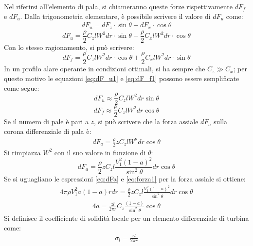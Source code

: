 Nel riferirsi all'elemento di pala, si chiameranno queste forze rispettivamente $dF_f$ e $dF_u$. Dalla trigonometria elementare, è possibile scrivere il valore di $dF_u$ come:
\begin{align*}
dF_u = dF_z \cdot \sin \theta - dF_x \cdot \cos \theta
\end{align*}
\begin{equation}\label{eq:dF_u1}
dF_u = \frac{\rho}{2} C_z l W^2 dr \cdot \sin \theta - \frac{\rho}{2} C_x l W^2 dr \cdot \cos \theta
\end{equation}
Con lo stesso ragionamento, si può scrivere:
\begin{equation}\label{eq:dF_f1}
dF_f = \frac{\rho}{2} C_z l W^2 dr \cdot \cos \theta + \frac{\rho}{2} C_x l W^2 dr \cdot \sin \theta
\end{equation}
In un profilo alare operante in condizioni ottimali, si ha sempre che $C_z \gg C_x$; per questo motivo le equazioni \ref{eq:dF_u1} e \ref{eq:dF_f1} possono essere semplificate come segue:
\begin{equation}\label{eq:dF_u2}
dF_u \approx \frac{\rho}{2} C_zl W^2 dr \sin \theta
\end{equation}
\begin{equation}\label{eq:dF_f2}
dF_f \approx \frac{\rho}{2} C_zl W^2 dr \cos \theta
\end{equation}
Se il numero di pale è pari a $z$, si può scrivere che la forza assiale $dF_a$ sulla corona differenziale di pala è:
\begin{align*}
dF_a = \frac{\rho}{2} z C_z l W^2 dr \cos \theta
\end{align*}
Si rimpiazza $W^2$ con il suo valore in funzione di $\theta$:
\begin{equation}\label{eq:dFa}
dF_a = \frac{\rho}{2} z C_z l \frac{V_1^2 \left( 1- a \right)^2}{\sin^2 \theta} dr \cos \theta
\end{equation}
Se si uguagliano le espressioni \ref{eq:dFa} e \ref{eq:forza1} per la forza assiale si ottiene:
\begin{align*}
4 \pi \rho V_1^2 a \left( 1-a \right) r dr = \frac{\rho}{2} z C_z l \frac{V_1^2 \left( 1- a \right)^2 }{\sin^2 \theta} dr \cos \theta
\end{align*}
\begin{align*}
4 a = \frac{z l }{2 \pi r} C_z \frac{\left( 1- a \right)}{\sin^2 \theta} \cos \theta
\end{align*}
Si definisce il coefficiente di solidità locale per un elemento differenziale di turbina come:
\begin{align*}
\sigma_l = \frac{z l}{2 \pi r}
\end{align*}
